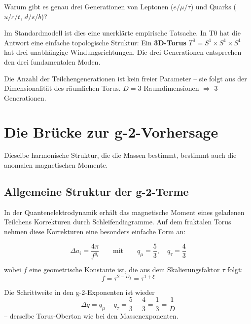 	Warum gibt es genau drei Generationen von Leptonen ($e/\mu/\tau$) und Quarks ($u/c/t$, $d/s/b$)?
	
	Im Standardmodell ist dies eine unerklärte empirische Tatsache. In T0 hat die Antwort eine einfache topologische Struktur: Ein \textbf{3D-Torus} $T^3 = S^1 \times S^1 \times S^1$ hat drei unabhängige Windungsrichtungen. Die drei Generationen entsprechen den drei fundamentalen Moden.
	
	\begin{keypoint}
		Die Anzahl der Teilchengenerationen ist kein freier Parameter -- sie folgt aus der Dimensionalität des räumlichen Torus. $D = 3$ Raumdimensionen $\Rightarrow$ 3 Generationen.
	\end{keypoint}
	
	
	\section{Die Brücke zur g-2-Vorhersage}
	
	Dieselbe harmonische Struktur, die die Massen bestimmt, bestimmt auch die anomalen magnetischen Momente.
	
	\subsection{Allgemeine Struktur der g-2-Terme}
	
	In der Quantenelektrodynamik erhält das magnetische Moment eines geladenen Teilchens Korrekturen durch Schleifendiagramme. Auf dem fraktalen Torus nehmen diese Korrekturen eine besonders einfache Form an:
	
	\begin{equation}
		\Delta a_i = \frac{4\pi}{f^{q_i}} \qquad \text{mit} \qquad q_\mu = \frac{5}{3}, \quad q_\tau = \frac{4}{3}
		\label{eq:g2-fractal}
	\end{equation}
	
	wobei $f$ eine geometrische Konstante ist, die aus dem Skalierungsfaktor $\tau$ folgt:
	\begin{equation}
		f = \tau^{2-D_f} = \tau^{1+\xi}
	\end{equation}
	
	Die Schrittweite in den g-2-Exponenten ist wieder
	\begin{equation}
		\Delta q = q_\mu - q_\tau = \frac{5}{3} - \frac{4}{3} = \frac{1}{3} = \frac{1}{D}
	\end{equation}
	-- derselbe Torus-Oberton wie bei den Massenexponenten.
	
